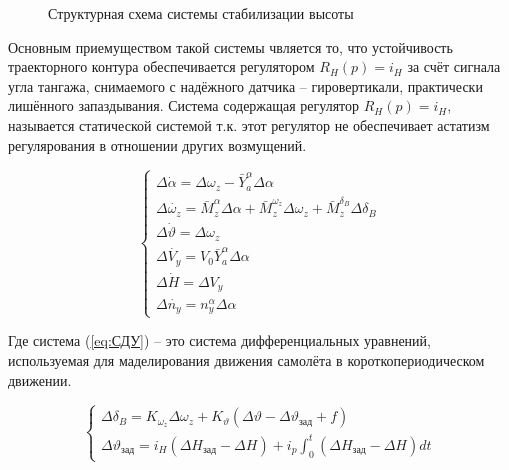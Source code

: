 \documentclass[a4paper,12pt]{article}
\begin{document}
\begin{figure}[H]
    \caption{Структурная схема системы стабилизации высоты}
    \label{fig:2}
\end{figure}

Основным приемуществом такой системы чвляется то, что устойчивость траекторного контура обеспечивается 
регулятором $R_H(p)=i_H$ за счёт сигнала угла тангажа, снимаемого с надёжного датчика -- гировертикали, практически лишённого запаздывания.
Система содержащая регулятор $R_H(p)=i_H$, называется статической системой т.к. этот регулятор не обеспечивает астатизм регулярования в отношении других возмущений. 


\begin{equation}
    \begin{cases}
        \Delta\dot{\alpha}=\Delta\omega_z-\bar{Y}^\alpha_a\Delta\alpha\\
        \Delta\dot{\omega_z} = \bar{M}^\alpha_z\Delta\alpha+\bar{M}^{\omega_z}_z\Delta\omega_z+\bar{M}^{\delta_B}_z\Delta\delta_B\\
        \Delta\dot{\vartheta} = \Delta\omega_z\\
        \Delta\dot{V_y}=V_0\bar{Y}^\alpha_a\Delta\alpha\\
        \Delta\dot{H}=\Delta V_y\\
        \Delta\dot{n_y}=n^\alpha_y\Delta\alpha
    \end{cases}
    \label{eq:СДУ}
\end{equation}

Где система (\ref{eq:СДУ}) -- это система дифференциальных уравнений, используемая для маделирования
движения самолёта в короткопериодическом движении. 

\begin{equation}
    \begin{cases}
        \Delta\delta_B=K_{\omega_z}\Delta\omega_z+K_{\vartheta}(\Delta\vartheta-\Delta\vartheta_{зад}+f)\\
        \Delta\vartheta_{зад} = i_H(\Delta H_{\text{зад}}-\Delta H)+i_p\int_{0}^{t}(\Delta H_{зад}-\Delta H)dt
    \end{cases}
    \label{eq:заданные значения}
\end{equation}
\end{document}
